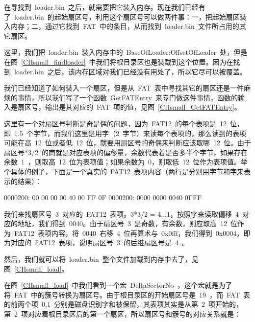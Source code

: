 在寻找到~loader.bin~之后，就需要把它装入内存。现在我们已经有了~loader.bin~的起始扇区号，利用这个扇区号可以做两件事：一，把起始扇区装入内存；二，通过它找到~FAT~中的条目，从而找到~loader.bin~文件所占用的其它扇区。

这里，我们把~loader.bin~装入内存中的~BaseOfLoader:OffsetOfLoader~处，但是在图~\ref{CHsmall_findloader}~中我们将根目录区也是装载到这个位置。因为在找到~loader.bin~之后，该内存区域对我们已经没有用处了，所以它尽可以被覆盖。

我们已经知道了如何装入一个扇区，但是从~FAT~表中寻找其它的扇区还是一件麻烦的事情，所以我们写了一个函数~GetFATEntry~来专门做这件事情，函数的输入是扇区号，输出是其对应的~FAT~项的值，见图~\ref{CHsmall_GetFATEntry}。

\label{CHsmall_GetFATEntry}

这里有一个对扇区号判断是奇是偶的问题，因为~FAT12~的每个表项是~12~位，即~1.5~个字节，而我们这里是用字（2~字节）来读每个表项的，那么读到的表项可能在高~12~位或者低~12~位，就要用扇区号的奇偶来判断应该取哪~12~位。由于扇区号*3/2~的商就是对应表项的偏移量，余数代表着是否多半个字节，如果存在余数~1~，则取高~12~位为表项值；如果余数为~0，则取低~12~位作为表项值。举个具体的例子，下面是一个真实的~FAT12~表项内容（两行是分别用字节和字来表示的结果）：
\begin{Command}
0000200: 00 00 00 00 40 00 FF 0F
0000200:  0000  0000  0040  0FFF
\end{Command}
我们来找扇区号~3~对应的~FAT12~表项。3*3/2 = 4...1，按照字来读取偏移~4~对应的地址，我们得到~0040。由于扇区号~3~是奇数，有余数，则应取高~12~位作为~FAT12~表项内容，将~0040~右移~4~位再算术与~0x0fff，我们得到~0x0004，即为对应的~FAT12~表项，说明扇区号~3~的后继扇区号是~4~。

然后，我们就可以将~loader.bin~整个文件加载到内存中去了，见图~\ref{CHsmall_load}。

\label{CHsmall_load}

在图~\ref{CHsmall_load}~中我们看到一个宏~DeltaSectorNo~，这个宏就是为了将~FAT~中的簇号转换为扇区号。由于根目录区的开始扇区号是~19~，而~FAT~表的前两个项~0,1~分别是磁盘识别字和被保留，其表项其实是从第~2~项开始的，第~2~项对应着根目录区后的第一个扇区，所以扇区号和簇号的对应关系就是：

